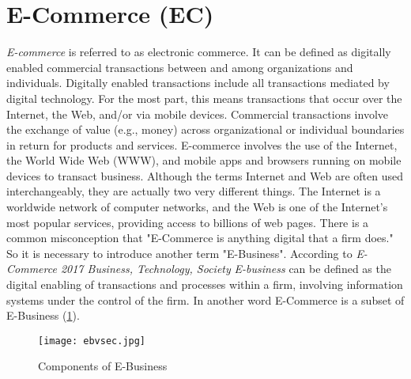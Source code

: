 \documentclass[10pt,journal,compsoc]{IEEEtran}
\begin{document}
	\section{E-Commerce (EC)}
	\emph{E-commerce} is referred to as electronic commerce\cite{jain2021overview}.\cite{ecbook2017} It can be defined as digitally enabled commercial transactions between and
	among organizations and individuals. Digitally enabled transactions include all transactions
	mediated by digital technology. For the most part, this means transactions that occur
	over the Internet, the Web, and/or via mobile devices. Commercial transactions involve
	the exchange of value (e.g., money) across organizational or individual boundaries in
	return for products and services. E-commerce involves the use of the Internet, the World Wide Web (WWW), and mobile
	apps and browsers running on mobile devices to transact business. Although the terms
	Internet and Web are often used interchangeably, they are actually two very different
	things. The Internet is a worldwide network of computer networks, and the Web is one
	of the Internet’s most popular services, providing access to billions of web pages.\cite{ecbook2017}
	There is a common misconception that "E-Commerce is anything digital that a firm does." So it is necessary to introduce another term "E-Business".
	According to \emph{E-Commerce 2017 Business, Technology, Society} \emph{E-business} can be defined as the digital enabling of transactions and processes within a firm, involving information systems under the control of the firm.\cite{ecbook2017} In another word E-Commerce is a subset of E-Business (\cref{eb}).
	\begin{figure}[h]
		\texttt{[image: ebvsec.jpg]}
		\caption{Components of E-Business}
		\label{eb}
	\end{figure}
\end{document}
